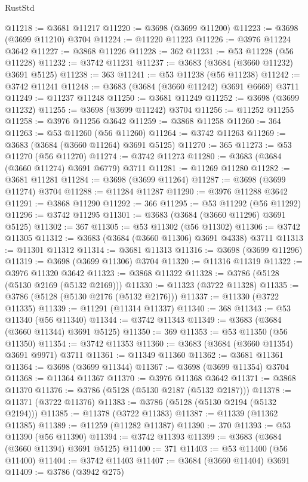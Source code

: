 \begin{lexlean}{RustStd}
\begin{coremodule}
{\begin{coremodule}
{{{{{{{{{{{{{{{{{{{{{{{{{{{{{{{{{{{{{{{{{{{{{{{@11218 := @3681 @11217
@11220 := @3698 (@3699 @11200)
@11223 := @3698 (@3699 @11210) @3704
@11224 := @11220 @11223
@11226 := @3976 @11224 @3642
@11227 := @3868 @11226
@11228 := 362
@11231 := @53 @11228 (@56 @11228)
@11232 := @3742 @11231
@11237 := @3683 (@3684 (@3660 @11232) @3691 @5125)
@11238 := 363
@11241 := @53 @11238 (@56 @11238)
@11242 := @3742 @11241
@11248 := @3683 (@3684 (@3660 @11242) @3691 @6669) @3711
@11249 := @11237 @11248
@11250 := @3681 @11249
@11252 := @3698 (@3699 @11232)
@11255 := @3698 (@3699 @11242) @3704
@11256 := @11252 @11255
@11258 := @3976 @11256 @3642
@11259 := @3868 @11258
@11260 := 364
@11263 := @53 @11260 (@56 @11260)
@11264 := @3742 @11263
@11269 := @3683 (@3684 (@3660 @11264) @3691 @5125)
@11270 := 365
@11273 := @53 @11270 (@56 @11270)
@11274 := @3742 @11273
@11280 := @3683 (@3684 (@3660 @11274) @3691 @6779) @3711
@11281 := @11269 @11280
@11282 := @3681 @11281
@11284 := @3698 (@3699 @11264)
@11287 := @3698 (@3699 @11274) @3704
@11288 := @11284 @11287
@11290 := @3976 @11288 @3642
@11291 := @3868 @11290
@11292 := 366
@11295 := @53 @11292 (@56 @11292)
@11296 := @3742 @11295
@11301 := @3683 (@3684 (@3660 @11296) @3691 @5125)
@11302 := 367
@11305 := @53 @11302 (@56 @11302)
@11306 := @3742 @11305
@11312 := @3683 (@3684 (@3660 @11306) @3691 @4338) @3711
@11313 := @11301 @11312
@11314 := @3681 @11313
@11316 := @3698 (@3699 @11296)
@11319 := @3698 (@3699 @11306) @3704
@11320 := @11316 @11319
@11322 := @3976 @11320 @3642
@11323 := @3868 @11322
@11328 := @3786 (@5128 (@5130 @2169 (@5132 @2169)))
@11330 := @11323 (@3722 @11328)
@11335 := @3786 (@5128 (@5130 @2176 (@5132 @2176)))
@11337 := @11330 (@3722 @11335)
@11339 := @11291 (@11314 @11337)
@11340 := 368
@11343 := @53 @11340 (@56 @11340)
@11344 := @3742 @11343
@11349 := @3683 (@3684 (@3660 @11344) @3691 @5125)
@11350 := 369
@11353 := @53 @11350 (@56 @11350)
@11354 := @3742 @11353
@11360 := @3683 (@3684 (@3660 @11354) @3691 @9971) @3711
@11361 := @11349 @11360
@11362 := @3681 @11361
@11364 := @3698 (@3699 @11344)
@11367 := @3698 (@3699 @11354) @3704
@11368 := @11364 @11367
@11370 := @3976 @11368 @3642
@11371 := @3868 @11370
@11376 := @3786 (@5128 (@5130 @2187 (@5132 @2187)))
@11378 := @11371 (@3722 @11376)
@11383 := @3786 (@5128 (@5130 @2194 (@5132 @2194)))
@11385 := @11378 (@3722 @11383)
@11387 := @11339 (@11362 @11385)
@11389 := @11259 (@11282 @11387)
@11390 := 370
@11393 := @53 @11390 (@56 @11390)
@11394 := @3742 @11393
@11399 := @3683 (@3684 (@3660 @11394) @3691 @5125)
@11400 := 371
@11403 := @53 @11400 (@56 @11400)
@11404 := @3742 @11403
@11407 := @3684 (@3660 @11404) @3691
@11409 := @3786 (@3942 @275)
}}}}}}}}}}}}}}}}}}}}}}}}}}}}}}}}}}}}}}}}}}}}}}}
\end{coremodule}}
\end{coremodule}
\end{lexlean}
